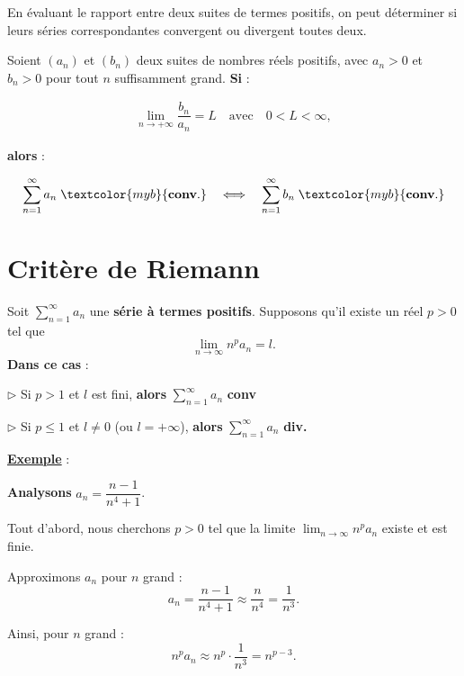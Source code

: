 \documentclass{report}
\begin{document}
\begin{multicols*}{3}
En évaluant le rapport entre deux suites de termes positifs, on peut déterminer
si leurs séries correspondantes convergent ou divergent toutes deux.

Soient \( (a_n) \) et \( (b_n) \) deux suites de nombres réels positifs, avec
\( a_n > 0 \) et \( b_n > 0 \) pour tout \( n \) suffisamment grand. \textbf{Si}  :

\begin{align*}
\lim_{n \to+\infty} \dfrac{b_n}{a_n} = L \quad \text{avec} \quad 0 < L < \infty,
\end{align*}

\textbf{alors}  :

    \begin{align*}
    \sum_{n=1}^{\infty} a_n \; \textcolor{myb}{\textbf{conv}.}  \quad 
    \Longleftrightarrow 
    \quad%
    \sum_{n=1}^{\infty} b_n \; 
    \textcolor{myb}{\textbf{conv}.} 
    \end{align*}
    \vspace{-1em}
    \section{Critère de Riemann}
    Soit $\sum_{n=1}^{\infty} a_n$ une \textbf{série à termes positifs}. Supposons 
    qu'il existe un réel $p > 0$ tel que 
    \[
    \lim_{n \to \infty} n^p a_n = l.
    \]
    \textbf{Dans ce cas } :

    \noindent
      $\rhd$ Si $p > 1$ et $l$ est fini, \textbf{alors} $\sum_{n=1}^{\infty} a_n$ 
    \textcolor{myb}{\textbf{conv}} 

    \vspace{0.75em}
    \noindent
      $\rhd$ Si $p \leq 1$ et $l \neq 0$ (ou $l = +\infty$), \textbf{alors }   
      $\sum_{n=1}^{\infty} a_n$ \textcolor{myr}{\textbf{div.}}
 

    \vspace{1em}
    \noindent
    \underline{\textbf{Exemple}} :

    \textbf{Analysons}  $a_n = \dfrac{n-1}{n^4+1}$. 

    \vspace{1em}
Tout d'abord, nous cherchons $p > 0$ tel que la limite
$\lim_{n \to \infty} n^p a_n$ existe et est finie.

Approximons $a_n$ pour $n$ grand :
\[
a_n = \frac{n - 1}{n^4 + 1} \approx \frac{n}{n^4} = \frac{1}{n^3}.
\]

Ainsi, pour $n$ grand :
\[
n^p a_n \approx n^p \cdot \frac{1}{n^3} = n^{p - 3}.
\]


\end{multicols*}
\end{document}
